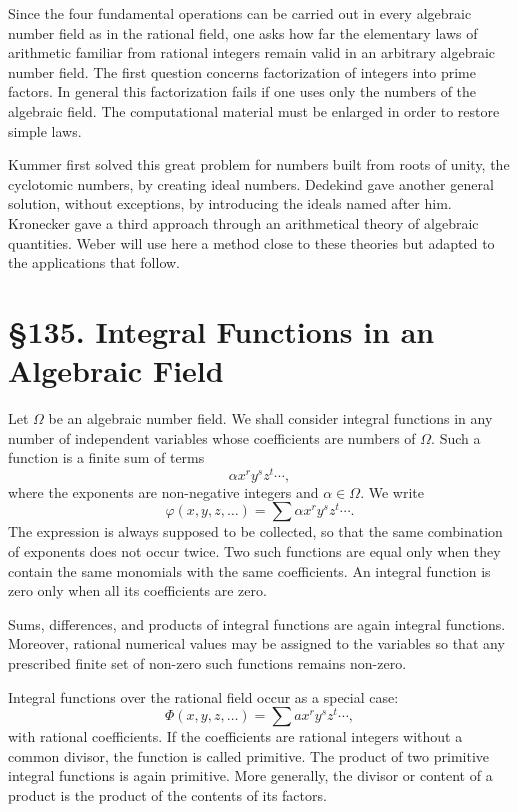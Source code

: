 \documentclass[11pt,a4paper]{book}
\newcommand{\webersection}[2]{\clearpage\section*{\S #1. #2}}
\begin{document}
Since the four fundamental operations can be carried out in every algebraic number field as in the rational field, one asks how far the elementary laws of arithmetic familiar from rational integers remain valid in an arbitrary algebraic number field.  The first question concerns factorization of integers into prime factors.  In general this factorization fails if one uses only the numbers of the algebraic field.  The computational material must be enlarged in order to restore simple laws.

Kummer first solved this great problem for numbers built from roots of unity, the cyclotomic numbers, by creating ideal numbers.  Dedekind gave another general solution, without exceptions, by introducing the ideals named after him.  Kronecker gave a third approach through an arithmetical theory of algebraic quantities.  Weber will use here a method close to these theories but adapted to the applications that follow.

\webersection{135}{Integral Functions in an Algebraic Field}

Let \(\Omega\) be an algebraic number field.  We shall consider integral functions in any number of independent variables whose coefficients are numbers of \(\Omega\).  Such a function is a finite sum of terms
\[
 \alpha x^r y^s z^t\cdots,
\]
where the exponents are non-negative integers and \(\alpha\in\Omega\).  We write
\begin{equation}
 \varphi(x,y,z,\ldots)=\sum \alpha x^r y^s z^t\cdots . \tag{1}
\end{equation}
The expression is always supposed to be collected, so that the same combination of exponents does not occur twice.  Two such functions are equal only when they contain the same monomials with the same coefficients.  An integral function is zero only when all its coefficients are zero.

Sums, differences, and products of integral functions are again integral functions.  Moreover, rational numerical values may be assigned to the variables so that any prescribed finite set of non-zero such functions remains non-zero.

Integral functions over the rational field occur as a special case:
\[
 \Phi(x,y,z,\ldots)=\sum a x^r y^s z^t\cdots,
\]
with rational coefficients.  If the coefficients are rational integers without a common divisor, the function is called primitive.  The product of two primitive integral functions is again primitive.  More generally, the divisor or content of a product is the product of the contents of its factors.
\end{document}
